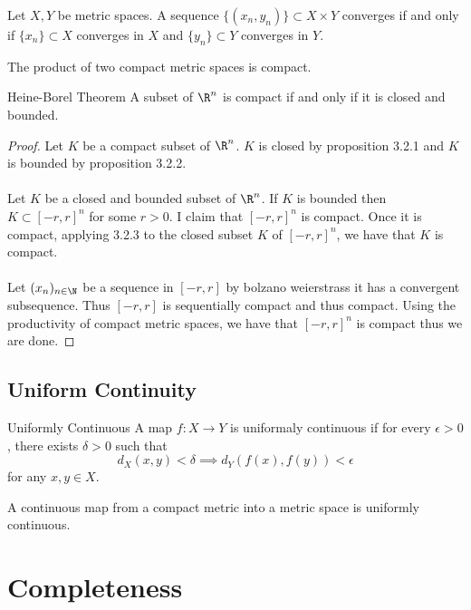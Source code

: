 \documentclass[a4paper]{article}
\begin{document}
\begin{lmm}{}{} Let $X,Y$ be metric spaces. A sequence $\{(x_n,y_n)\}\subset X\times Y$ converges if and only if $\{x_n\}\subset X$ converges in $X$ and $\{y_n\}\subset Y$ converges in $Y$. 
\end{lmm}

\begin{prp}{}{} The product of two compact metric spaces is compact. 
\end{prp}

\begin{thm}{Heine-Borel Theorem}{} A subset of $\R^n$ is compact if and only if it is closed and bounded. \tcbline
\begin{proof}
Let $K$ be a compact subset of $\R^n$. $K$ is closed by proposition 3.2.1 and $K$ is bounded by proposition 3.2.2. \\~\\
Let $K$ be a closed and bounded subset of $\R^n$. If $K$ is bounded then $K\subset[-r,r]^n$ for some $r>0$. I claim that $[-r,r]^n$ is compact. Once it is compact, applying 3.2.3 to the closed subset $K$ of $[-r,r]^n$, we have that $K$ is compact. \\~\\
Let $(x_n)_{n\in\N}$ be a sequence in $[-r,r]$ by bolzano weierstrass it has a convergent subsequence. Thus $[-r,r]$ is sequentially compact and thus compact. Using the productivity of compact metric spaces, we have that $[-r,r]^n$ is compact thus we are done. 
\end{proof}
\end{thm}

\subsection{Uniform Continuity}
\begin{defn}{Uniformly Continuous}{} A map $f:X\to Y$ is uniformaly continuous if for every $\epsilon>0$, there exists $\delta>0$ such that $$d_X(x,y)<\delta\implies d_Y(f(x),f(y))<\epsilon$$ for any $x,y\in X$. 
\end{defn}

\begin{thm}{}{} A continuous map from a compact metric into a metric space is uniformly continuous. 
\end{thm}

\pagebreak
\section{Completeness}
\end{document}
